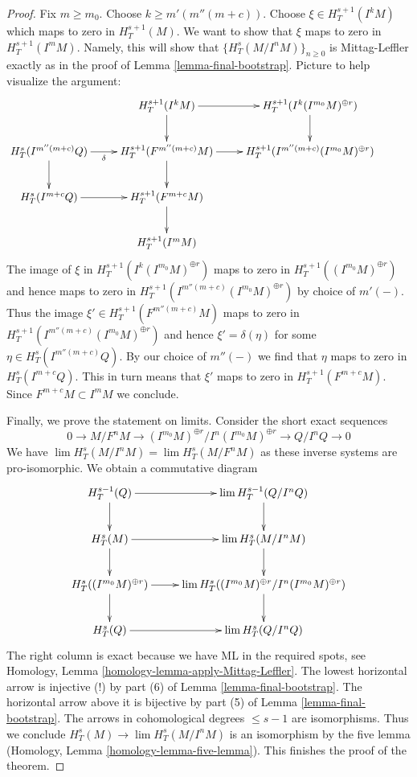\begin{proof}
\medskip\noindent
Fix $m \geq m_0$. Choose $k \geq m'(m''(m + c))$.
Choose $\xi \in H^{s + 1}_T(I^kM)$
which maps to zero in $H^{s + 1}_T(M)$.
We want to show that $\xi$ maps to zero in $H^{s + 1}_T(I^mM)$.
Namely, this will show that $\{H^s_T(M/I^nM)\}_{n \geq 0}$
is Mittag-Leffler exactly as in the proof of Lemma \ref{lemma-final-bootstrap}.
Picture to help visualize the argument:
$$
\xymatrix{
&
H^{s + 1}_T(I^kM) \ar[r] \ar[d] &
H^{s + 1}_T(I^k(I^{m_0}M)^{\oplus r}) \ar[d] &
\\
H^s_T(I^{m''(m + c)}Q) \ar[r]_-\delta \ar[d] &
H^{s + 1}_T(F^{m''(m + c)}M) \ar[r] \ar[d] &
H^{s + 1}_T(I^{m''(m + c)}(I^{m_0}M)^{\oplus r}) \\
H^s_T(I^{m + c}Q) \ar[r] &
H^{s + 1}_T(F^{m + c}M) \ar[d] &
\\
&
H^{s + 1}_T(I^mM)
}
$$
The image of $\xi$ in $H^{s + 1}_T(I^k(I^{m_0}M)^{\oplus r})$
maps to zero in $H^{s + 1}_T((I^{m_0}M)^{\oplus r})$
and hence maps to zero in
$H^{s + 1}_T(I^{m''(m + c)}(I^{m_0}M)^{\oplus r})$
by choice of $m'(-)$.
Thus the image $\xi' \in H^{s + 1}_T(F^{m''(m + c)}M)$
maps to zero in $H^{s + 1}_T(I^{m''(m + c)}(I^{m_0}M)^{\oplus r})$
and hence $\xi' = \delta(\eta)$ for some
$\eta \in H^s_T(I^{m''(m + c)}Q)$.
By our choice of $m''(-)$ we find that $\eta$ maps to
zero in $H^s_T(I^{m + c}Q)$.
This in turn means that $\xi'$ maps to zero in
$H^{s + 1}_T(F^{m + c}M)$.
Since $F^{m + c}M \subset I^mM$ we conclude.

\medskip\noindent
Finally, we prove the statement on limits. Consider the short
exact sequences
$$
0 \to M/F^nM \to (I^{m_0}M)^{\oplus r}/I^n (I^{m_0}M)^{\oplus r}
\to Q/I^nQ \to 0
$$
We have $\lim H^s_T(M/I^nM) = \lim H^s_T(M/F^nM)$
as these inverse systems are pro-isomorphic. We obtain a commutative diagram
$$
\xymatrix{
H^{s - 1}_T(Q) \ar[r] \ar[d] &
\lim H^{s - 1}_T(Q/I^nQ) \ar[d] \\
H^s_T(M) \ar[r] \ar[d] &
\lim H^s_T(M/I^nM) \ar[d] \\
H^s_T((I^{m_0}M)^{\oplus r}) \ar[r] \ar[d] &
\lim H^s_T((I^{m_0}M)^{\oplus r}/I^n(I^{m_0}M)^{\oplus r}) \ar[d] \\
H^s_T(Q) \ar[r] &
\lim H^s_T(Q/I^nQ)
}
$$
The right column is exact because we have ML in the required spots, see
Homology, Lemma \ref{homology-lemma-apply-Mittag-Leffler}.
The lowest horizontal arrow is injective (!) by
part (6) of Lemma \ref{lemma-final-bootstrap}.
The horizontal arrow above it is bijective by
part (5) of Lemma \ref{lemma-final-bootstrap}.
The arrows in cohomological degrees $\leq s - 1$ are isomorphisms.
Thus we conclude $H^s_T(M) \to \lim H^s_T(M/I^nM)$
is an isomorphism by the five lemma
(Homology, Lemma \ref{homology-lemma-five-lemma}).
This finishes the proof of the theorem.
\end{proof}

